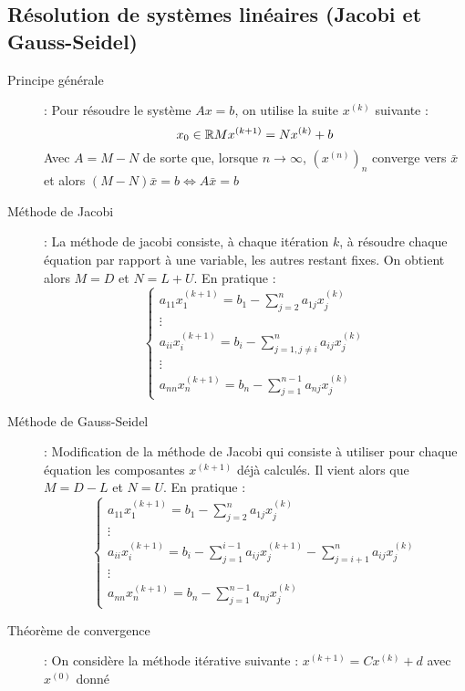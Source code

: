 \subsection{Résolution de systèmes linéaires (Jacobi et Gauss-Seidel)}
\begin{description}
\item[Principe générale] : Pour résoudre le système $Ax=b$, on utilise la suite $x^{(k)}$ suivante :
    \[
        x_0\in\mathbb{R}\\
        Mx^{(k+1)}=Nx^{(k)}+b
    \]
    Avec $A=M-N$ de sorte que, lorsque $n\rightarrow\infty$, $(x^{(n)})_n$ converge vers $\bar x$ et alors $(M-N)\bar x=b\Leftrightarrow A\bar x=b$
\item[Méthode de Jacobi] : La méthode de jacobi consiste, à chaque itération $k$, à résoudre chaque équation par rapport à une variable, les autres restant fixes.
    On obtient alors $M=D$ et $N=L+U$. En pratique :
        \[
            \begin{cases}
                a_{11}x_1^{(k+1)} = b_1 - \sum_{j=2}^{n} a_{1j}x_j^{(k)}\\
                \vdots \\
                a_{ii}x_i^{(k+1)} = b_i - \sum_{j=1,j\ne i}^{n} a_{ij}x_j^{(k)}\\
                \vdots \\
                a_{nn}x_n^{(k+1)} = b_n - \sum_{j=1}^{n-1} a_{nj}x_j^{(k)}
            \end{cases}
        \]
\item[Méthode de Gauss-Seidel] : Modification de la méthode de Jacobi qui consiste à utiliser pour chaque équation les composantes $x^{(k+1)}$ déjà calculés.
    Il vient alors que $M=D-L$ et $N=U$. En pratique :
        \[
            \begin{cases}
                a_{11}x_1^{(k+1)} = b_1 - \sum_{j=2}^{n} a_{1j}x_j^{(k)}\\
                \vdots \\
                a_{ii}x_i^{(k+1)} = b_i - \sum_{j=1}^{i-1} a_{ij}x_j^{(k+1)} - \sum_{j=i+1}^{n} a_{ij}x_j^{(k)} \\
                \vdots \\
                a_{nn}x_n^{(k+1)} = b_n - \sum_{j=1}^{n-1} a_{nj}x_j^{(k)}
            \end{cases}
        \]
\item[Théorème de convergence] : On considère la méthode itérative suivante : $x^{(k+1)}=Cx^{(k)}+d$ avec $x^{(0)}$ donné
    \begin{itemize}

\end{itemize}
\end{description}

